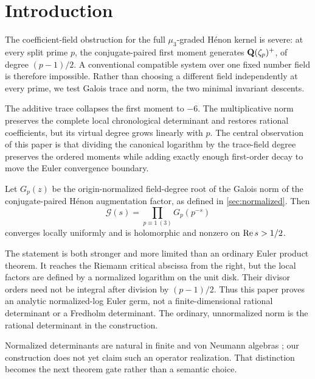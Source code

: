 \section{Introduction}

The coefficient-field obstruction for the full $\mu_3$-graded H\'enon kernel
is severe: at every split prime $p$, the conjugate-paired first moment
generates $\mathbf Q(\zeta_p)^+$, of degree $(p-1)/2$.  A conventional compatible
system over one fixed number field is therefore impossible.  Rather than
choosing a different field independently at every prime, we test Galois trace
and norm, the two minimal invariant descents.

The additive trace collapses the first moment to $-6$.  The multiplicative
norm preserves the complete local chronological determinant and restores
rational coefficients, but its virtual degree grows linearly with $p$.
The central observation of this paper is that dividing the canonical
logarithm by the trace-field degree preserves the ordered moments while
adding exactly enough first-order decay to move the Euler convergence boundary.

\begin{theorem}\label{thm:main}
Let $G_p(z)$ be the origin-normalized field-degree root of the Galois norm of
the conjugate-paired H\'enon augmentation factor, as defined in
\cref{sec:normalized}.  Then
\[
 \mathcal G(s)=\prod_{p\equiv1\ (3)}G_p(p^{-s})
\]
converges locally uniformly and is holomorphic and nonzero on
$\operatorname{Re} s>1/2$.
\end{theorem}

The statement is both stronger and more limited than an ordinary Euler
product theorem.  It reaches the Riemann critical abscissa from the right,
but the local factors are defined by a normalized logarithm on the unit disk.
Their divisor orders need not be integral after division by $(p-1)/2$.
Thus this paper proves an analytic normalized-log Euler germ, not a
finite-dimensional rational determinant or a Fredholm determinant.  The
ordinary, unnormalized norm is the rational determinant in the construction.

Normalized determinants are natural in finite and von Neumann algebras
\cite{FugledeKadison1952,DeLaHarpe2000}; our construction does not yet claim
such an operator realization.  That distinction becomes the next theorem
gate rather than a semantic choice.
